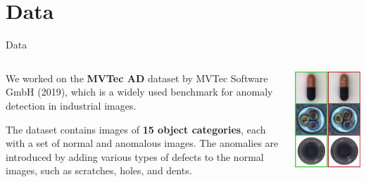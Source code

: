 \documentclass{beamer}
\begin{document}
\section{Data}
\begin{frame}{Data}
\begin{columns}
\begin{column}{0.7\textwidth}
      We worked on the \textbf{MVTec AD} \cite{mvtecad} dataset by MVTec Software GmbH (2019), which is a
       widely used benchmark for anomaly detection in industrial images.\newline

        The dataset contains images of \textbf{15 object categories}, each with a
         set of normal and anomalous images.
          The anomalies are introduced by adding various types of defects to the
           normal images, such as scratches, holes, and dents.
\end{column}
           \begin{column}{0.3\textwidth}
            \includegraphics[width=\textwidth]
            {assets/mvtec}
            \end{column}
            \end{columns}
                  
\end{frame}
\end{document}
